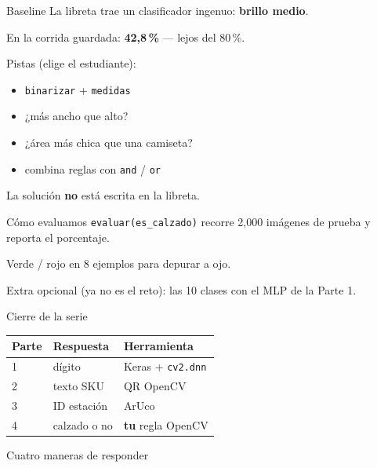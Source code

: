 \documentclass[aspectratio=169]{beamer}
\begin{document}
\begin{frame}{Baseline}
  La libreta trae un clasificador ingenuo: \textbf{brillo medio}.

  En la corrida guardada: \textbf{42{,}8\,\%} --- lejos del 80\,\%.

  Pistas (elige el estudiante):
  \begin{itemize}
    \item \texttt{binarizar} + \texttt{medidas}
    \item ¿más ancho que alto?
    \item ¿área más chica que una camiseta?
    \item combina reglas con \texttt{and} / \texttt{or}
  \end{itemize}

  La solución \textbf{no} está escrita en la libreta.
\end{frame}

\begin{frame}{Cómo evaluamos}
  \texttt{evaluar(es\_calzado)} recorre 2{,}000 imágenes de prueba y reporta el porcentaje.

  Verde / rojo en 8 ejemplos para depurar a ojo.

  Extra opcional (ya no es el reto): las 10 clases con el MLP de la Parte 1.
\end{frame}

\begin{frame}{Cierre de la serie}
  \begin{tabular}{@{}lll@{}}
    \toprule
    Parte & Respuesta & Herramienta \\
    \midrule
    1 & dígito & Keras + \texttt{cv2.dnn} \\
    2 & texto SKU & QR OpenCV \\
    3 & ID estación & ArUco \\
    4 & calzado o no & \textbf{tu} regla OpenCV \\
    \bottomrule
  \end{tabular}

  \vspace{1em}
  Cuatro maneras de responder \pregunta
\end{frame}
\end{document}
